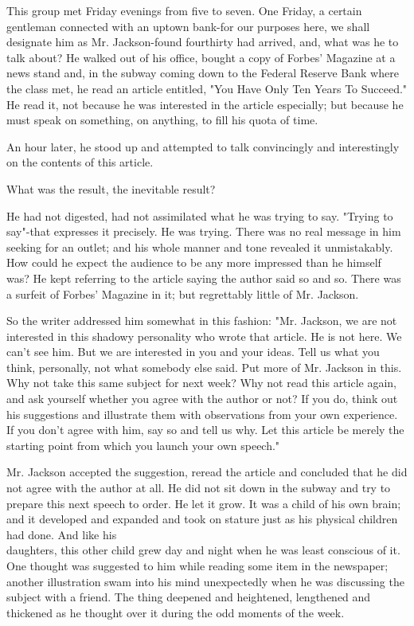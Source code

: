 \documentclass[10pt]{article}
\begin{document}
This group met Friday evenings from five to seven. One Friday, a certain gentleman connected with an uptown bank-for our purposes here, we shall designate him as Mr. Jackson-found fourthirty had arrived, and, what was he to talk about? He walked out of his office, bought a copy of Forbes' Magazine at a news stand and, in the subway coming down to the Federal Reserve Bank where the class met, he read an article entitled, "You Have Only Ten Years To Succeed." He read it, not because he was interested in the article especially; but because he must speak on something, on anything, to fill his quota of time.

An hour later, he stood up and attempted to talk convincingly and interestingly on the contents of this article.

What was the result, the inevitable result?

He had not digested, had not assimilated what he was trying to say. "Trying to say"-that expresses it precisely. He was trying. There was no real message in him seeking for an outlet; and his whole manner and tone revealed it unmistakably. How could he expect the audience to be any more impressed than he himself was? He kept referring to the article saying the author said so and so. There was a surfeit of Forbes' Magazine in it; but regrettably little of Mr. Jackson.

So the writer addressed him somewhat in this fashion: "Mr. Jackson, we are not interested in this shadowy personality who wrote that article. He is not here. We can't see him. But we are interested in you and your ideas. Tell us what you think, personally, not what somebody else said. Put more of Mr. Jackson in this. Why not take this same subject for next week? Why not read this article again, and ask yourself whether you agree with the author or not? If you do, think out his suggestions and illustrate them with observations from your own experience. If you don't agree with him, say so and tell us why. Let this article be merely the starting point from which you launch your own speech."

Mr. Jackson accepted the suggestion, reread the article and concluded that he did not agree with the author at all. He did not sit down in the subway and try to prepare this next speech to order. He let it grow. It was a child of his own brain; and it developed and expanded and took on stature just as his physical children had done. And like his\\
daughters, this other child grew day and night when he was least conscious of it. One thought was suggested to him while reading some item in the newspaper; another illustration swam into his mind unexpectedly when he was discussing the subject with a friend. The thing deepened and heightened, lengthened and thickened as he thought over it during the odd moments of the week.
\end{document}
